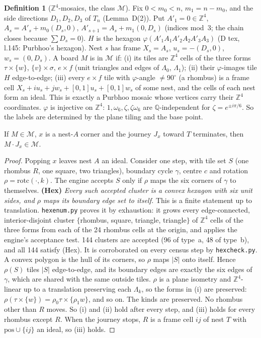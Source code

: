 \documentclass[11pt]{article}
\theoremstyle{definition}\newtheorem{definition}[theorem]{Definition}\newtheorem{remark}[theorem]{Remark}
\newcommand{\Z}{\mathbb Z}\newcommand{\R}{\mathbb R}
\newcommand{\M}{\mathcal M}\newcommand{\F}{\mathcal F}
\begin{document}
\begin{definition}[$\Z^4$-mosaics, the class $\M$]\label{def:M}
Fix $0<m_0<n$, $m_1=n-m_0$, and the side directions $D_1,D_2,D_3$ of $T_n$ (Lemma~D(2)). Put $A'_1=0\in\Z^4$, $A_s=A'_s+m_0(D_s,0)$, $A'_{s+1}=A_s+m_1(0,D_s)$ (indices mod~3; the chain closes because $\sum D_s=0$). $H$ is the hexagon $\varphi(A'_1A_1A'_2A_2A'_3A_3)$ (D tex, l.145: Purbhoo's hexagon). Nest $s$ has frame $X_s=A_s$, $u_s=-(D_s,0)$, $w_s=(0,D_s)$. A board $M$ is in $\M$ if:
(i) its tiles are $\Z^4$ cells of the three forms $\tau\times\{w\}$, $\{v\}\times\sigma$, $e\times f$ (unit triangles and edges of $\Lambda_0$, $\Lambda_1$);
(ii) their $\varphi$-images tile $H$ edge-to-edge;
(iii) every $e\times f$ tile with $\varphi$-angle $\ne90^\circ$ (a rhombus) is a frame cell $X_s+iu_s+jw_s+[0,1]u_s+[0,1]w_s$ of some nest, and the cells of each nest form an ideal.
This is exactly a Purbhoo mosaic whose vertices carry their $\Z^4$ coordinates. $\varphi$ is injective on $\Z^4$: $1,\omega_6,\zeta,\zeta\omega_6$ are $\mathbb Q$-independent for $\zeta=e^{\pm i\pi/6}$. So the labels are determined by the plane tiling and the base point.
\end{definition}

\begin{lemma}[(Mos-P): journeys preserve $\M$]\label{lem:mosP}
If $M\in\M$, $x$ is a nest-$A$ corner and the journey $J_x$ toward $T$ terminates, then $M\cdot J_x\in\M$.
\end{lemma}
\begin{proof}
Popping $x$ leaves nest $A$ an ideal. Consider one step, with tile set $S$ (one rhombus $R$, one square, two triangles), boundary cycle $\gamma$, centre $c$ and rotation $\rho=\mathrm{rotc}(\cdot,k)$. The engine accepts $S$ only if $\rho$ maps the six corners of $\gamma$ to themselves. \textbf{(Hex)} \emph{Every such accepted cluster is a convex hexagon with six unit sides, and $\rho$ maps its boundary edge set to itself.} This is a finite statement up to translation. \texttt{hexenum.py} proves it by exhaustion: it grows every edge-connected, interior-disjoint cluster $\{$rhombus, square, triangle, triangle$\}$ of $\Z^4$ cells of the three forms from each of the 24 rhombus cells at the origin, and applies the engine's acceptance test. 144 clusters are accepted (96 of type~a, 48 of type~b), and all 144 satisfy (Hex). It is corroborated on every census step by \texttt{hexcheck.py}. A convex polygon is the hull of its corners, so $\rho$ maps $|S|$ onto itself. Hence $\rho(S)$ tiles $|S|$ edge-to-edge, and its boundary edges are exactly the six edges of $\gamma$, which are shared with the same outside tiles. $\rho$ is a plane isometry and $\Z^4$-linear up to a translation preserving each $\Lambda_k$, so the forms in (i) are preserved: $\rho(\tau\times\{w\})=\rho_0\tau\times\{\rho_1w\}$, and so on. The kinds are preserved. No rhombus other than $R$ moves. So (i) and (ii) hold after every step, and (iii) holds for every rhombus except $R$. When the journey stops, $R$ is a frame cell $ij$ of nest $T$ with $\mathrm{pos}\cup\{ij\}$ an ideal, so (iii) holds.
\end{proof}
\end{document}
